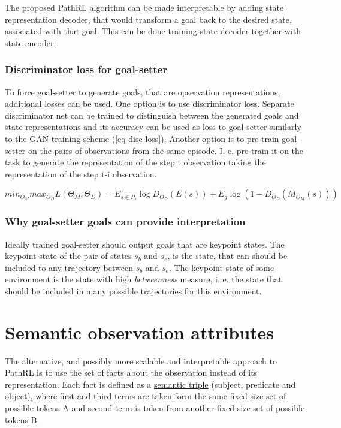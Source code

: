 \documentclass[acmsmall, nonacm]{acmart}
\begin{document}
The proposed PathRL algorithm can be made interpretable by adding state representation decoder, that would transform a goal back to the desired state, associated with that goal. This can be done training state decoder together with state encoder.

\subsubsection{Discriminator loss for goal-setter}

To force goal-setter to generate goals, that are opservation representations, additional losses can be used. One option is to use discriminator loss. Separate discriminator net can be trained to distinguish between the generated goals and state representations and its accuracy can be used as loss to goal-setter similarly to the GAN training scheme (\ref{eq-disc-loss}). Another option is to pre-train goal-setter on the pairs of observations from the same episode. I. e. pre-train it on the task to generate the representation of the step t observation taking the representation of the step t-i observation.

\begin{equation} \label{eq-disc-loss}
min_{\Theta_M} max_{\Theta_D} L(\Theta_M, \Theta_D) = E_{s \in P_s} \log D_{\Theta_D}(E(s)) + E_g \log(1 - D_{\Theta_D}(M_{\Theta_M}(s)))
\end{equation}

\subsubsection{Why goal-setter goals can provide interpretation}

Ideally trained goal-setter should output goals that are keypoint states. The keypoint state of the pair of states $s_b$ and $s_e$, is the state, that can should be included to any trajectory between $s_b$ and $s_e$. The keypoint state of some environment is the state with high \emph{betweenness} measure, i. e. the state that should be included in many possible trajectories for this environment.

\section{Semantic observation attributes}
\label{sec:semantic-attr}

The alternative, and possibly more scalable and interpretable approach to PathRL is to use the set of facts about the observation instead of its representation. Each fact is defined as a \href{https://en.wikipedia.org/wiki/Semantic_triple}{semantic triple} (subject, predicate and object), where first and third terms are taken form the same fixed-size set of possible tokens A and second term is taken from another fixed-size set of possible tokens B.
\end{document}
